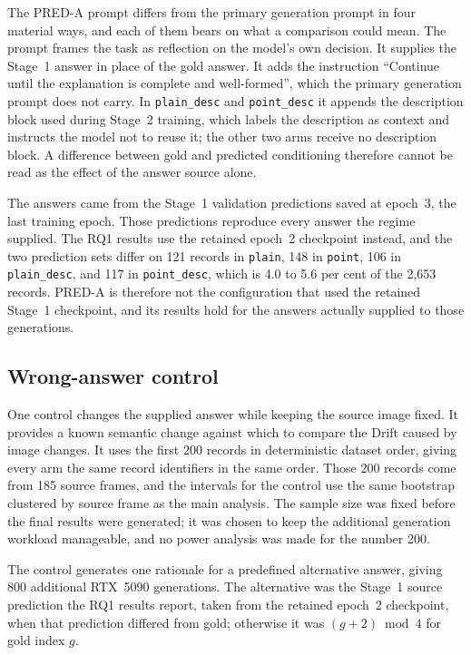 The PRED-A prompt differs from the primary generation prompt in four material
ways, and each of them bears on what a comparison could mean. The prompt frames
the task as reflection on the model's own decision. It supplies the Stage~1
answer in place of the gold answer. It adds the instruction \enquote{Continue
until the explanation is complete and well-formed}, which the primary generation
prompt does not carry. In \texttt{plain\_desc} and \texttt{point\_desc} it
appends the description block used during Stage~2 training, which labels the
description as context and instructs the model not to reuse it; the other two
arms receive no description block. A difference between gold and predicted
conditioning therefore cannot be read as the effect of the answer source alone.

The answers came from the Stage~1 validation predictions saved at epoch~3, the
last training epoch. Those predictions reproduce every answer the regime
supplied. The RQ1 results use the retained epoch~2 checkpoint instead, and the
two prediction sets differ on 121 records in \texttt{plain}, 148 in
\texttt{point}, 106 in \texttt{plain\_desc}, and 117 in \texttt{point\_desc},
which is 4.0 to 5.6 per cent of the 2,653 records. PRED-A is therefore not the
configuration that used the retained Stage~1 checkpoint, and its results hold for
the answers actually supplied to those generations.

\subsection{Wrong-answer control}
\label{sec:setup-known-change}

One control changes the supplied answer while keeping the source image fixed. It
provides a known semantic change against which to compare the Drift caused by
image changes. It uses the first 200 records in
deterministic dataset order, giving every arm the same record identifiers in the
same order. Those 200 records come from 185
source frames, and the intervals for the control use the same bootstrap
clustered by source frame as the main analysis. The sample size was fixed before
the final results were generated; it was chosen to keep the additional
generation workload manageable, and no power analysis was made for the number 200.

The control generates one rationale for a predefined alternative answer, giving
800 additional RTX~5090 generations. The alternative
was the Stage~1 source prediction the RQ1 results report, taken from the
retained epoch~2 checkpoint, when that prediction differed from gold; otherwise
it was $(g+2)\bmod4$ for gold index $g$.

